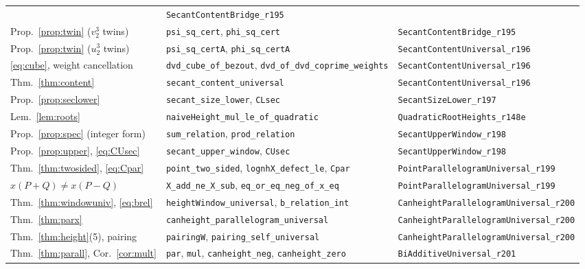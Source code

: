 \documentclass[11pt,reqno]{amsart}
\theoremstyle{plain}
\theoremstyle{definition}
\theoremstyle{remark}
\DeclareRobustCommand{\lt}[1]{\texttt{#1}}
\begin{document}
\begin{longtable}{@{}p{}p{}p{}@{}}
  & \lt{SecantContentBridge\_r195}\\
Prop.~\ref{prop:twin} ($v_2^3$ twins)
  & \lt{psi\_sq\_cert}, \lt{phi\_sq\_cert}
  & \lt{SecantContentBridge\_r195}\\
Prop.~\ref{prop:twin} ($u_2^3$ twins)
  & \lt{psi\_sq\_certA}, \lt{phi\_sq\_certA}
  & \lt{SecantContentUniversal\_r196}\\
\eqref{eq:cube}, weight cancellation
  & \lt{dvd\_cube\_of\_bezout},\newline
    \lt{dvd\_of\_dvd\_coprime\_weights}
  & \lt{SecantContentUniversal\_r196}\\
Thm.~\ref{thm:content}
  & \lt{secant\_content\_universal}
  & \lt{SecantContentUniversal\_r196}\\
Prop.~\ref{prop:seclower}
  & \lt{secant\_size\_lower}, \lt{CLsec}
  & \lt{SecantSizeLower\_r197}\\
Lem.~\ref{lem:roots}
  & \lt{naiveHeight\_mul\_le\_of\_quadratic}
  & \lt{QuadraticRootHeights\_r148e}\\
Prop.~\ref{prop:spec} (integer form)
  & \lt{sum\_relation}, \lt{prod\_relation}
  & \lt{SecantUpperWindow\_r198}\\
Prop.~\ref{prop:upper}, \eqref{eq:CUsec}
  & \lt{secant\_upper\_window}, \lt{CUsec}
  & \lt{SecantUpperWindow\_r198}\\
Thm.~\ref{thm:twosided}, \eqref{eq:Cpar}
  & \lt{point\_two\_sided},\newline
    \lt{lognhX\_defect\_le}, \lt{Cpar}
  & \lt{PointParallelogramUniversal\_r199}\\
$x(P{+}Q) \ne x(P{-}Q)$
  & \lt{X\_add\_ne\_X\_sub},\newline
    \lt{eq\_or\_eq\_neg\_of\_x\_eq}
  & \lt{PointParallelogramUniversal\_r199}\\
Thm.~\ref{thm:windowuniv}, \eqref{eq:brel}
  & \lt{heightWindow\_universal},\newline
    \lt{b\_relation\_int}
  & \lt{CanheightParallelogramUniversal\_r200}\\
Thm.~\ref{thm:parx}
  & \lt{canheight\_parallelogram\_universal}
  & \lt{CanheightParallelogramUniversal\_r200}\\
Thm.~\ref{thm:height}(5), pairing
  & \lt{pairingW}, \lt{pairing\_self\_universal}
  & \lt{CanheightParallelogramUniversal\_r200}\\
Thm.~\ref{thm:parall}, Cor.~\ref{cor:mult}
  & \lt{par}, \lt{mul}, \lt{canheight\_neg},\newline
    \lt{canheight\_zero}
  & \lt{BiAdditiveUniversal\_r201}\\

\end{longtable}
\end{document}
